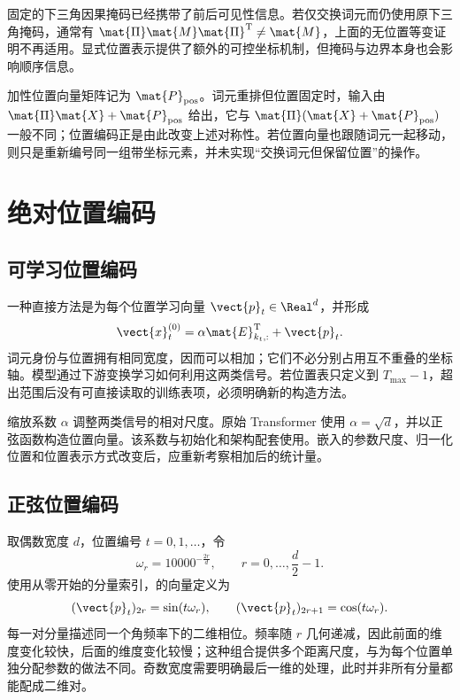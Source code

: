 \documentclass[../textbook.tex]{subfiles}
\begin{document}
固定的下三角因果掩码已经携带了前后可见性信息。若仅交换词元而仍使用原下三角掩码，通常有 $\mat{\Pi} \mat{M}\mat{\Pi}^{\mathrm{T}}\ne \mat{M}$，上面的无位置等变证明不再适用。显式位置表示提供了额外的可控坐标机制，但掩码与边界本身也会影响顺序信息。

加性位置向量矩阵记为 $\mat{P}_{\mathrm{pos}}$。词元重排但位置固定时，输入由 $\mat{\Pi} \mat{X}+\mat{P}_{\mathrm{pos}}$ 给出，它与 $\mat{\Pi}(\mat{X}+\mat{P}_{\mathrm{pos}})$ 一般不同；位置编码正是由此改变上述对称性。若位置向量也跟随词元一起移动，则只是重新编号同一组带坐标元素，并未实现“交换词元但保留位置”的操作。

\section{绝对位置编码}

\subsection{可学习位置编码}
一种直接方法是为每个位置学习向量 $\vect{p}_t\in\Real^d$，并形成
\begin{equation}
 \vect{x}_t^{(0)}=\alpha \mat{E}_{k_t,:}^{\mathrm{T}}+\vect{p}_t.
\end{equation}
词元身份与位置拥有相同宽度，因而可以相加；它们不必分别占用互不重叠的坐标轴。模型通过下游变换学习如何利用这两类信号。若位置表只定义到 $T_{\max}-1$，超出范围后没有可直接读取的训练表项，必须明确新的构造方法。

缩放系数 $\alpha$ 调整两类信号的相对尺度。原始 Transformer 使用 $\alpha=\sqrt d$，并以正弦函数构造位置向量\cite{vaswani2017attention}。该系数与初始化和架构配套使用。嵌入的参数尺度、归一化位置和位置表示方式改变后，应重新考察相加后的统计量。

\subsection{正弦位置编码}
取偶数宽度 $d$，位置编号 $t=0,1,\ldots$，令
\begin{equation}
 \omega_r=10000^{-\frac{2r}{d}},\qquad r=0,\ldots,\frac{d}{2}-1.
\end{equation}
使用从零开始的分量索引，的向量定义为
\begin{equation}
 (\vect{p}_t)_{2r}=\sin(t\omega_r),\qquad
 (\vect{p}_t)_{2r+1}=\cos(t\omega_r).
 \label{eq:pos-sinusoidal}
\end{equation}
每一对分量描述同一个角频率下的二维相位。频率随 $r$ 几何递减，因此前面的维度变化较快，后面的维度变化较慢；这种组合提供多个距离尺度，与为每个位置单独分配参数的做法不同。奇数宽度需要明确最后一维的处理，此时并非所有分量都能配成二维对。
\end{document}

